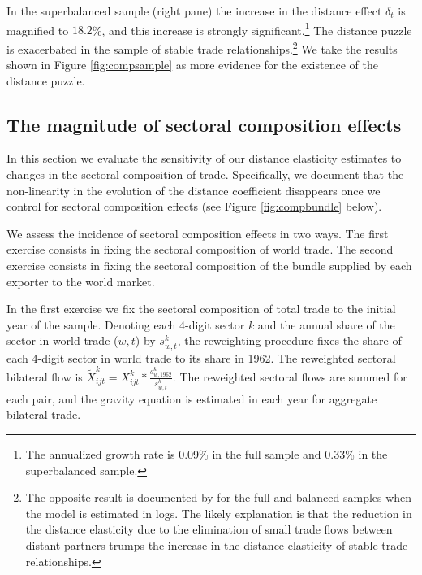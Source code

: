 \documentclass[12pt,twoside,a4paper,notitlepage]{article}
\begin{document}
In the superbalanced sample (right pane) the increase in the distance effect $\delta_t$ is magnified to $18.2$\%, and this increase is strongly significant.\footnote{The annualized growth rate is 0.09\% in the full sample and 0.33\% in the superbalanced sample.}
The distance puzzle is exacerbated in the sample of stable trade relationships.\footnote{The opposite result is documented by \cite{Head2013} for the full and balanced samples when the model is estimated in logs. The likely explanation is that the reduction 
in the distance elasticity due to the elimination of small trade flows between distant partners trumps the increase in the distance elasticity of stable trade relationships.}
We take the results shown in Figure \ref{fig:compsample} as more evidence for the existence of the distance puzzle. 

\subsection{The magnitude of sectoral composition effects} \label{subsec:robustpuzzle}
In this section we evaluate the sensitivity of our distance elasticity estimates to changes in the sectoral composition of trade.
Specifically, we document that the non-linearity in the evolution of the distance coefficient disappears once we control for sectoral composition effects (see Figure \ref{fig:compbundle} below).

We assess the incidence of sectoral composition effects in two ways.
The first exercise consists in fixing the sectoral composition of world trade.
The second exercise consists in fixing the sectoral composition of the bundle supplied by each exporter to the world market.


In the first exercise we fix the sectoral composition of total trade to the initial year of the sample.
Denoting each 4-digit sector $k$ and the annual share of the sector in world trade ($w,t$) by $s^{k}_{w,t}$, the reweighting procedure fixes the share of each 4-digit sector in world trade to its share in 1962.
The reweighted sectoral bilateral flow is $\tilde{X}^k_{ijt}=X^k_{ijt}*\frac{s^k_{w,1962}}{s^k_{w,t}}$.
The reweighted sectoral flows are summed for each pair, and the gravity equation is estimated in each year for aggregate bilateral trade.
\end{document}
